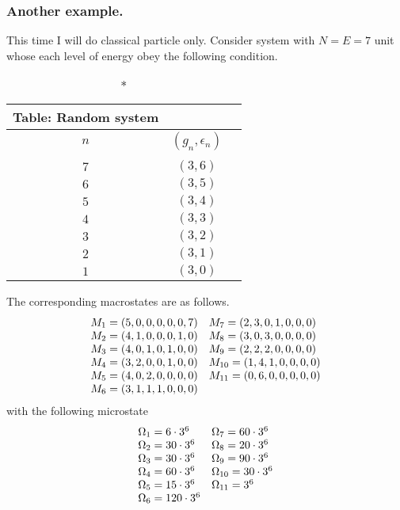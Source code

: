 \documentclass[../../../Main.tex]{subfiles}
\begin{document}
\subsubsection*{Another example.} This time I will do classical particle only. Consider system with $N=E=7$ unit whose each level of energy obey the following condition.
\begin{longtable}{c c c}
    \caption*{Table: Random system}\\
    \hline
    $n$ & $(g_n,\epsilon_n)$\\ 
    \hline\\
    $7$&$(3,6)$\\
    $6$&$(3,5)$\\
    $5$&$(3,4)$\\ 
    $4$&$(3,3)$\\
    $3$&$(3,2)$\\
    $2$&$(3,1)$\\
    $1$&$(3,0)$\\
\end{longtable}
The corresponding macrostates are as follows.
\begin{equation*}
    \begin{array}{l l}
        M_1=(5,0,0,0,0,0,7)& M_7=(2,3,0,1,0,0,0)\\
        M_2=(4,1,0,0,0,1,0)& M_8=(3,0,3,0,0,0,0)\\
        M_3=(4,0,1,0,1,0,0)& M_9=(2,2,2,0,0,0,0)\\
        M_4=(3,2,0,0,1,0,0)& M_{10}=(1,4,1,0,0,0,0)\\
        M_5=(4,0,2,0,0,0,0)&M_{11}=(0,6,0,0,0,0,0)\\
        M_6=(3,1,1,1,0,0,0)&
    \end{array}
\end{equation*}
with the following microstate
\begin{equation*}
    \begin{array}{l l}
        \Omega_1=6\cdot3^6& \Omega_7=60\cdot3^6\\
        \Omega_2=30\cdot3^6& \Omega_8=20\cdot3^6\\
        \Omega_3=30\cdot3^6& \Omega_9=90\cdot3^6\\
        \Omega_4=60\cdot3^6& \Omega_{10}=30\cdot3^6\\
        \Omega_5=15\cdot3^6&\Omega_{11}=3^6\\
        \Omega_6=120\cdot3^6&
    \end{array}
\end{equation*}
\end{document}
